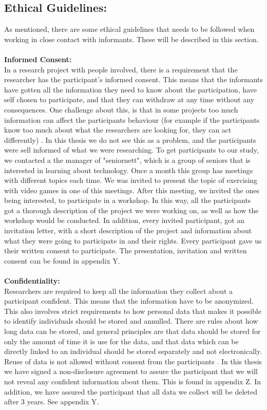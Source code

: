 \subsection{Ethical Guidelines:}
As mentioned, there are some ethical guidelines that needs to be followed when working in close contact with informants. These will be described in this section. \\ \\
\textbf{Informed Consent:} \\
In a research project with people involved, there is a requirement that the researcher has the participant's informed consent. This means that the informants have gotten all the information they need to know about the participation, have self chosen to participate, and that they can withdraw at any time without any consequences. One challenge about this, is that in some projects too much information can affect the participants behaviour (for example if the participants know too much about what the researchers are looking for, they can act differently) \cite{qualitative}. In this thesis we do not see this as a problem, and the participants were sell informed of what we were researching. To get participants to our study, we contacted a the manager of "seniornett", which is a group of seniors that is interested in learning about technology. Once a month this group has meetings with different topics each time. We was invited to present the topic of exercising with video games in one of this meetings. After this meeting, we invited the ones being interested, to participate in a workshop. In this way, all the participants got a thorough description of the project we were working on, as well as how the workshop would be conducted. In addition, every invited participant, got an invitation letter, with a short description of the project and information about what they were going to participate in and their rights. Every participant gave us their written consent to participate. The presentation, invitation and written consent can be found in appendix Y.   \\ \\
\textbf{Confidentiality:}\\
Researchers are required to keep all the information they collect about a participant confident. This means that the information have to be anonymized. This also involves strict requirements to how personal data that makes it possible to identify individuals should be stored and annulled. There are rules about how long data can be stored, and general principles are that data should be stored for only the amount of time it is use for the data, and that data which can be directly linked to an individual should be stored separately and not electronically.  Reuse of data is not allowed without consent from the participants \cite{qualitative}. In this thesis we have signed a non-disclosure agreement to assure the participant that we will not reveal any confident information about them. This is found in appendix Z. In addition, we have assured the participant that all data we collect will be deleted after 3 years. See appendix Y. \\ \\
